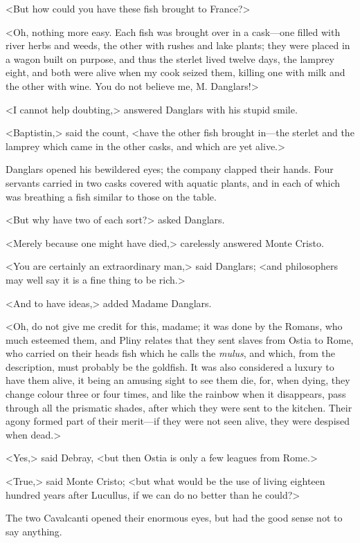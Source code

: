  <But how could you have these fish brought to France?> 

 <Oh, nothing more easy. Each fish was brought over in a cask—one filled with river herbs and weeds, the other with rushes and lake plants; they were placed in a wagon built on purpose, and thus the sterlet lived twelve days, the lamprey eight, and both were alive when my cook seized them, killing one with milk and the other with wine. You do not believe me, M. Danglars!> 

 <I cannot help doubting,> answered Danglars with his stupid smile. 

 <Baptistin,> said the count, <have the other fish brought in—the sterlet and the lamprey which came in the other casks, and which are yet alive.> 

 Danglars opened his bewildered eyes; the company clapped their hands. Four servants carried in two casks covered with aquatic plants, and in each of which was breathing a fish similar to those on the table. 

 <But why have two of each sort?> asked Danglars. 

 <Merely because one might have died,> carelessly answered Monte Cristo. 

 <You are certainly an extraordinary man,> said Danglars; <and philosophers may well say it is a fine thing to be rich.> 

 <And to have ideas,> added Madame Danglars. 

 <Oh, do not give me credit for this, madame; it was done by the Romans, who much esteemed them, and Pliny relates that they sent slaves from Ostia to Rome, who carried on their heads fish which he calls the \textit{mulus}, and which, from the description, must probably be the goldfish. It was also considered a luxury to have them alive, it being an amusing sight to see them die, for, when dying, they change colour three or four times, and like the rainbow when it disappears, pass through all the prismatic shades, after which they were sent to the kitchen. Their agony formed part of their merit—if they were not seen alive, they were despised when dead.> 

 <Yes,> said Debray, <but then Ostia is only a few leagues from Rome.> 

 <True,> said Monte Cristo; <but what would be the use of living eighteen hundred years after Lucullus, if we can do no better than he could?> 

 The two Cavalcanti opened their enormous eyes, but had the good sense not to say anything. 

